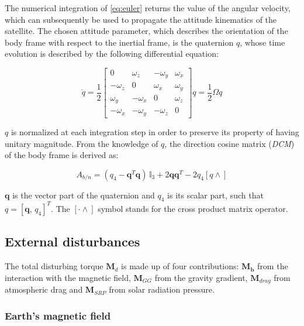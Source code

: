 The numerical integration of \cref{eq:euler} returns the value of the angular velocity, which can subsequently be used to propagate the attitude kinematics of the satellite. The chosen attitude parameter, which describes the orientation of the body frame with respect to the inertial frame, is the quaternion $q$, whose time evolution is described by the following differential equation:

\begin{equation}
    \dot{q} = \frac{1}{2} \begin{bmatrix}
    0 & \omega_z & - \omega_y & \omega_x \\
    - \omega_z & 0 & \omega_x & \omega_y \\
    \omega_y & - \omega_x & 0 & \omega_z \\
    - \omega_x & - \omega_y & -\omega_z & 0
    \end{bmatrix} q = \frac{1}{2} \Omega q
\end{equation}

$q$ is normalized at each integration step in order to preserve its property of having unitary magnitude. From the knowledge of $q$, the direction cosine matrix (\textit{DCM}) of the body frame is derived as:

\begin{equation}
    A_{b/n} = (q_4 - \mathbf{q}^T \mathbf{q})\,\mathbb{I}_3 + 2 \mathbf{q} \mathbf{q}^T - 2 q_4 [q \wedge]
    \label{eq:dcm}
\end{equation}

$\mathbf{q}$ is the vector part of the quaternion and $q_4$ is its scalar part, such that $q = [\mathbf{q}, \, q_4]^T$. The $[\cdot \wedge]$ symbol stands for the cross product matrix operator.

\subsection{External disturbances} \label{sec:disturbances}

The total disturbing torque $\mathbf{M}_d$ is made up of four contributions: $\mathbf{M}_{\mathbf{b}}$ from the interaction with the magnetic field, $\mathbf{M}_{GG}$ from the gravity gradient, $\mathbf{M}_{drag}$ from atmospheric drag and $\mathbf{M}_{SRP}$ from solar radiation pressure.

\subsubsection{Earth's magnetic field}

